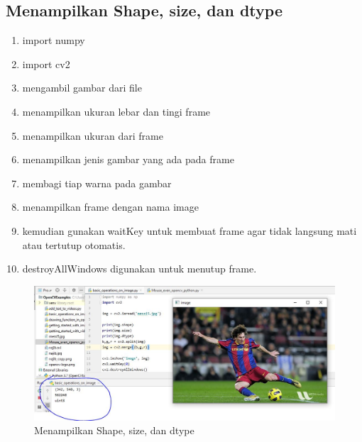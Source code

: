 \newpage
\subsection{Menampilkan Shape, size, dan dtype}

\begin{enumerate}
	\item import numpy
	\item import cv2
	\item mengambil gambar dari file 
	\item menampilkan ukuran lebar dan tingi frame
	\item menampilkan ukuran dari frame
	\item menampilkan jenis gambar yang ada pada frame
	\item membagi tiap warna pada gambar
	\item menampilkan frame dengan nama image 
	\item kemudian gunakan waitKey untuk membuat frame agar tidak langsung mati atau tertutup otomatis.
	\item destroyAllWindows digunakan untuk menutup frame.
\end{enumerate}

\newpage
\begin{figure}[ht]
\centering
\includegraphics[scale=0.45]{figures/2,26.jpg}
\caption{Menampilkan Shape, size, dan dtype}
\label{contoh}
\end{figure}



\newpage
